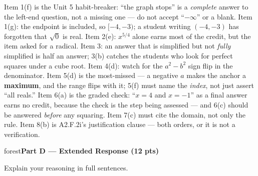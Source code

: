 \documentclass[10pt]{article}
\newcommand{\parthead}[1]{%
  \vspace{6pt}\noindent
  \begin{headlinebox}{forest}\color{white}\bfseries #1\end{headlinebox}%
  \vspace{4pt}}
\begin{document}
\begin{teachernote}
Item 1(f) is the Unit 5 habit-breaker: ``the graph stops'' is a \emph{complete} answer to the
left-end question, not a missing one --- do not accept ``$-\infty$'' or a blank. Item 1(g): the
endpoint is included, so $[-4,-3)$; a student writing $(-4,-3)$ has forgotten that $\sqrt0$ is real.
Item 2(e): $x^{5/4}$ alone earns most of the credit, but the item asked for a radical. Item 3: an
answer that is simplified but not \emph{fully} simplified is half an answer; 3(b) catches the
students who look for perfect squares under a cube root. Item 4(d): watch for the $a^2-b^2$ sign
flip in the denominator. Item 5(d) is the most-missed --- a negative $a$ makes the anchor a
\textbf{maximum}, and the range flips with it; 5(f) must name the \emph{index}, not just assert
``all reals.'' Item 6(a) is the graded check: ``$x=4$ and $x=-1$'' as a final answer earns no credit,
because the check is the step being assessed --- and 6(c) should be answered \emph{before} any
squaring. Item 7(c) must cite the domain, not only the rule. Item 8(b) is A2.F.2i's justification
clause --- both orders, or it is not a verification.
\end{teachernote}

\boxguard[36]%
\parthead{Part D --- Extended Response (12 pts)}
Explain your reasoning in full sentences.
\end{document}
